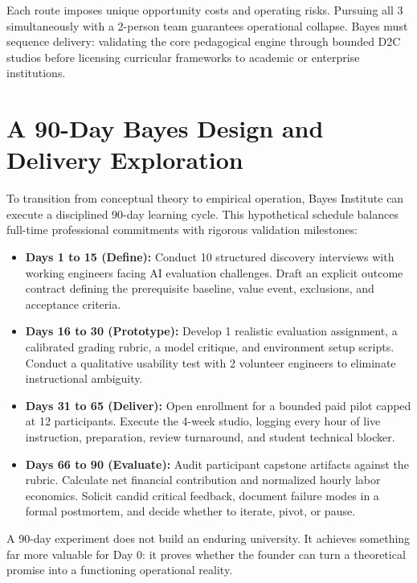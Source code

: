 Each route imposes unique opportunity costs and operating risks. Pursuing all 3 simultaneously with a 2-person team guarantees operational collapse. Bayes must sequence delivery: validating the core pedagogical engine through bounded D2C studios before licensing curricular frameworks to academic or enterprise institutions.

\section{A 90-Day Bayes Design and Delivery Exploration}

To transition from conceptual theory to empirical operation, Bayes Institute can execute a disciplined 90-day learning cycle. This hypothetical schedule balances full-time professional commitments with rigorous validation milestones:

\begin{itemize}[leftmargin=*]
\item \textbf{Days 1 to 15 (Define):} Conduct 10 structured discovery interviews with working engineers facing AI evaluation challenges. Draft an explicit outcome contract defining the prerequisite baseline, value event, exclusions, and acceptance criteria.
\item \textbf{Days 16 to 30 (Prototype):} Develop 1 realistic evaluation assignment, a calibrated grading rubric, a model critique, and environment setup scripts. Conduct a qualitative usability test with 2 volunteer engineers to eliminate instructional ambiguity.
\item \textbf{Days 31 to 65 (Deliver):} Open enrollment for a bounded paid pilot capped at 12 participants. Execute the 4-week studio, logging every hour of live instruction, preparation, review turnaround, and student technical blocker.
\item \textbf{Days 66 to 90 (Evaluate):} Audit participant capstone artifacts against the rubric. Calculate net financial contribution and normalized hourly labor economics. Solicit candid critical feedback, document failure modes in a formal postmortem, and decide whether to iterate, pivot, or pause.
\end{itemize}

A 90-day experiment does not build an enduring university. It achieves something far more valuable for Day 0: it proves whether the founder can turn a theoretical promise into a functioning operational reality.
